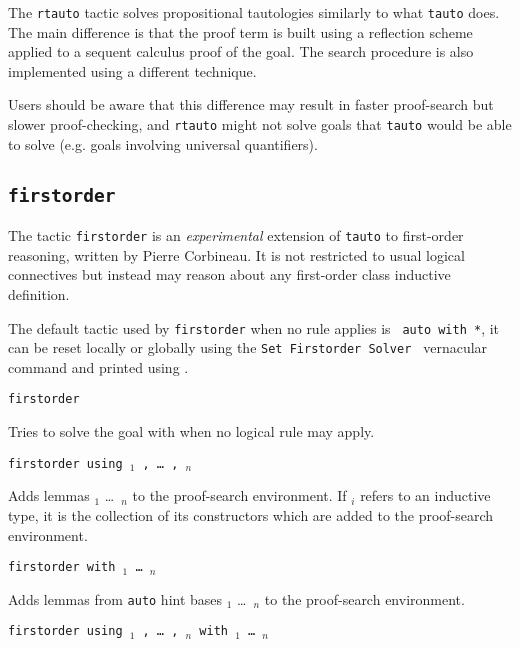 \begin{coq_example*}
The {\tt rtauto} tactic solves propositional tautologies similarly to what {\tt tauto} does. The main difference is that the proof term is built using a reflection scheme applied to a sequent calculus proof of the goal. The search procedure is also implemented using a different technique.

Users should be aware that this difference may result in faster proof-search but  slower proof-checking, and {\tt rtauto} might not solve goals that {\tt tauto} would be able to solve (e.g. goals involving universal quantifiers).

\subsection{\tt firstorder}
\label{firstorder}

The tactic \texttt{firstorder} is an {\it experimental} extension of
\texttt{tauto} to
first-order reasoning, written by Pierre Corbineau.
It is not restricted to usual logical connectives but
instead may reason about any first-order class inductive definition.

The default tactic used by \texttt{firstorder} when no rule applies is {\tt
  auto with *}, it can be reset locally or globally using the {\nobreak
  {\tt Set Firstorder Solver {\tac}}} 
vernacular command and printed using {}.

\begin{Variants}
 \item {\tt firstorder {\tac}}

   Tries to solve the goal with {\tac} when no logical rule may apply.

 \item {\tt firstorder using {\qualid}$_1$ , \dots\ , {\qualid}$_n$ }

   Adds lemmas {\qualid}$_1$ \dots\ {\qualid}$_n$ to the proof-search
   environment. If {\qualid}$_i$ refers to an inductive type, it is
   the collection of its constructors which are added to the
   proof-search environment.

 \item {\tt firstorder with \ident$_1$ \dots\ \ident$_n$ }

   Adds lemmas from {\tt auto} hint bases \ident$_1$ \dots\ \ident$_n$
   to the proof-search environment.

\item \texttt{firstorder {\tac} using {\qualid}$_1$ , \dots\ , {\qualid}$_n$ with \ident$_1$ \dots\ \ident$_n$}


\end{Variants}
\end{coq_example*}
